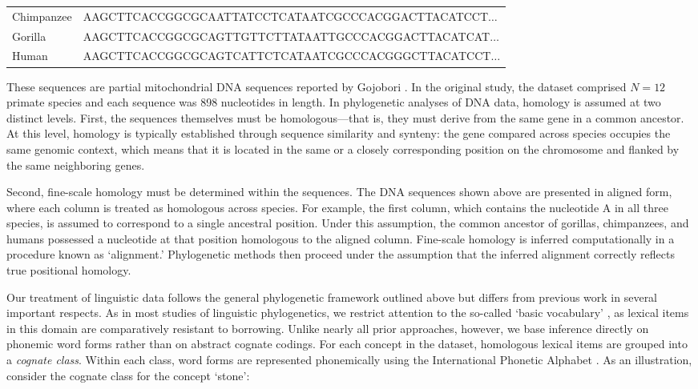 \documentclass[numsec,webpdf,modern,large,namedate]{oup-authoring-template}
\begin{document}
\setlength{\tabcolsep}{0pt}
\begin{tabular}{b{72pt} b{360pt} }
Chimpanzee & AAGCTTCACCGGCGCAATTATCCTCATAATCGCCCACGGACTTACATCCT$\ldots$\\
Gorilla & AAGCTTCACCGGCGCAGTTGTTCTTATAATTGCCCACGGACTTACATCAT$\ldots$\\
Human & AAGCTTCACCGGCGCAGTCATTCTCATAATCGCCCACGGGCTTACATCCT$\ldots$\\
\end{tabular}

These sequences are partial mitochondrial DNA sequences reported by Gojobori  \citep{Hayasaka1988}. In the original study, the dataset comprised $\textit{N}= 12$ primate species and each sequence was 898 nucleotides in length. In phylogenetic analyses of DNA data, homology is assumed at two distinct levels. First, the sequences themselves must be homologous---that is, they must derive from the same gene in a common ancestor. At this level, homology is typically established through sequence similarity and synteny: the gene compared across species occupies the same genomic context, which means that it is located in the same or a closely corresponding position on the chromosome and flanked by the same neighboring genes. 

Second, fine-scale homology must be determined within the sequences. The DNA sequences shown above are presented in aligned form, where each column is treated as homologous across species. For example, the first column, which contains the nucleotide A in all three species, is assumed to correspond to a single ancestral position. Under this assumption, the common ancestor of gorillas, chimpanzees, and humans possessed a nucleotide at that position homologous to the aligned column. Fine-scale homology is inferred computationally in a procedure known as ‘alignment.’ Phylogenetic methods then proceed under the assumption that the inferred alignment correctly reflects true positional homology. 

Our treatment of linguistic data follows the general phylogenetic framework outlined above but differs from previous work in several important respects. As in most studies of linguistic phylogenetics, we restrict attention to the so-called ‘basic vocabulary’ \citep{Swadesh1952,Chang2015,Greenhill2021,Auderset2023,Heggarty2023}, as lexical items in this domain are comparatively resistant to borrowing. Unlike nearly all prior approaches, however, we base inference directly on phonemic word forms rather than on abstract cognate codings. For each concept in the dataset, homologous lexical items are grouped into a \textit{cognate class}. Within each class, word forms are represented phonemically using the International Phonetic Alphabet  \citep{IPA1999}. As an illustration, consider the cognate class for the concept ‘stone’:
\end{document}
